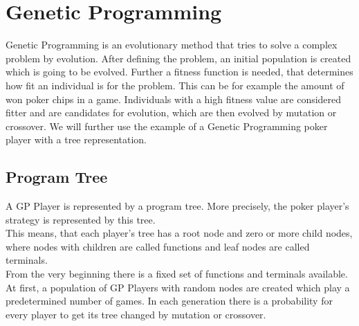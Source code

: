 \documentclass[12pt,fleqn,a4paper]{article}
\begin{document}

\newpage

%

\newpage
\section{Genetic Programming}
\label{sec:genprog}
Genetic Programming is an evolutionary method that tries to solve a complex problem by evolution.
After defining the problem, an initial population is created which is going to be evolved.
Further a fitness function is needed, that determines how fit an individual is for the problem.
This can be for example the amount of won poker chips in a game.
Individuals with a high fitness value are considered fitter and are candidates for evolution, which are then evolved by mutation or crossover.
We will further use the example of a Genetic Programming poker player with a tree representation.

\subsection{Program Tree}
A GP Player is represented by a program tree. More precisely, the poker player's strategy is represented by this tree.\\
This means, that each player's tree has a root node and zero or more child nodes, where nodes with children are called functions and leaf nodes are called terminals.\\
From the very beginning there is a fixed set of functions and terminals available.
At first, a population of GP Players with random nodes are created which play a predetermined number of games.
In each generation there is a probability for every player to get its tree changed by mutation or crossover.
\end{document}
